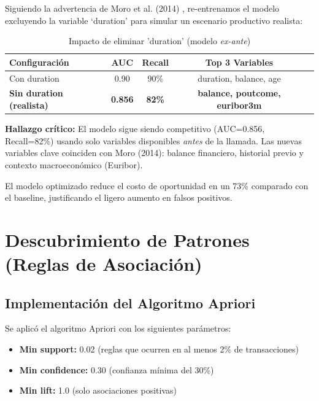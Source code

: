 \documentclass[12pt,letterpaper]{article}
\begin{document}
Siguiendo la advertencia de Moro et al. (2014) \cite{moro2014}, re-entrenamos el modelo excluyendo la variable `duration' para simular un escenario productivo realista:

\begin{table}[H]
\centering
\caption{Impacto de eliminar 'duration' (modelo \textit{ex-ante})}
\label{tab:sin_duration}
\small
\begin{tabular}{@{}lcccc@{}}
\toprule
\textbf{Configuración} & \textbf{AUC} & \textbf{Recall} & \textbf{Top 3 Variables} \\
\midrule
Con duration & 0.90 & 90\% & duration, balance, age \\
\textbf{Sin duration (realista)} & \textbf{0.856} & \textbf{82\%} & \textbf{balance, poutcome, euribor3m} \\
\bottomrule
\end{tabular}
\end{table}

\textbf{Hallazgo crítico:} El modelo sigue siendo competitivo (AUC=0.856, Recall=82\%) usando solo variables disponibles \textit{antes} de la llamada. Las nuevas variables clave coinciden con Moro (2014): balance financiero, historial previo y contexto macroeconómico (Euribor).

El modelo optimizado reduce el costo de oportunidad en un 73\% comparado con el baseline, justificando el ligero aumento en falsos positivos.

\newpage
\section{Descubrimiento de Patrones (Reglas de Asociación)}
\label{sec:apriori}

\subsection{Implementación del Algoritmo Apriori}

Se aplicó el algoritmo Apriori con los siguientes parámetros:

\begin{itemize}
    \item \textbf{Min support:} 0.02 (reglas que ocurren en al menos 2\% de transacciones)
    \item \textbf{Min confidence:} 0.30 (confianza mínima del 30\%)
    \item \textbf{Min lift:} 1.0 (solo asociaciones positivas)
\end{itemize}
\end{document}
